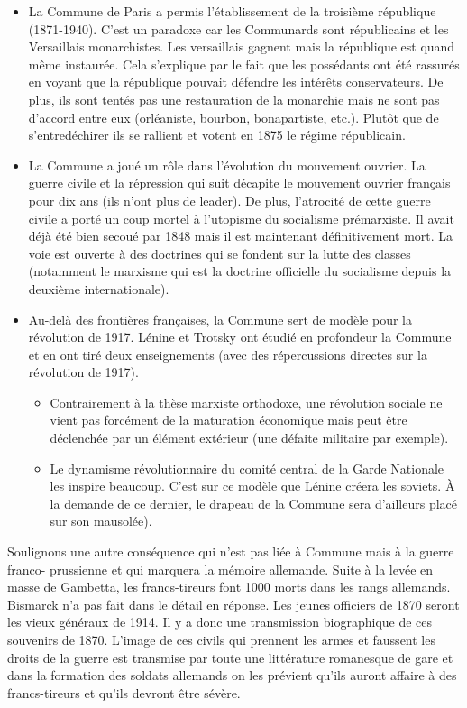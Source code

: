 \documentclass[12pt]{report}
\begin{document}
\begin{itemize}
	\item La Commune de Paris a permis l’établissement de la troisième république (1871-1940).
C’est un paradoxe car les Communards sont républicains et les Versaillais
monarchistes. Les versaillais gagnent mais la république est quand même instaurée.
Cela s'explique par le fait que les possédants ont été rassurés en voyant que la république pouvait défendre les
intérêts conservateurs. 
De plus, ils sont tentés pas une restauration de la monarchie
mais ne sont pas d’accord entre eux (orléaniste, bourbon, bonapartiste, etc.). Plutôt que
de s’entredéchirer ils se rallient et votent en 1875 le régime républicain.
\item La Commune a joué un rôle dans l'évolution du mouvement ouvrier. La guerre civile et la répression qui suit
décapite le mouvement ouvrier français pour dix ans (ils n'ont plus de leader).
De plus, l’atrocité de cette guerre civile a porté un coup mortel à l’utopisme du
socialisme prémarxiste. Il avait déjà été bien secoué par 1848 mais il est
maintenant définitivement mort. La voie est ouverte à des doctrines qui se
fondent sur la lutte des classes (notamment le marxisme qui est la doctrine
officielle du socialisme depuis la deuxième internationale).
\item Au-delà des frontières françaises, la Commune sert de modèle pour la révolution de
1917. Lénine et Trotsky ont étudié en profondeur la Commune et en ont tiré deux
enseignements (avec des répercussions directes sur la révolution de 1917).
\begin{itemize}
\item Contrairement à la thèse marxiste orthodoxe, une révolution sociale ne vient
pas forcément de la maturation économique mais peut être déclenchée par un
élément extérieur (une défaite militaire par exemple).
\item Le dynamisme révolutionnaire du comité central de la Garde Nationale les
inspire beaucoup. C’est sur ce modèle que Lénine créera les soviets. À la
demande de ce dernier, le drapeau de la Commune sera d’ailleurs placé sur son
mausolée).
\end{itemize}
\end{itemize}

Soulignons une autre conséquence qui n’est pas liée à Commune mais à la guerre franco-
prussienne et qui marquera la mémoire allemande. Suite à la levée en masse de Gambetta,
les francs-tireurs font 1000 morts dans les rangs allemands. Bismarck n’a pas fait dans le
détail en réponse. Les jeunes officiers de 1870 seront les vieux généraux de 1914. Il y a donc
une transmission biographique de ces souvenirs de 1870. L’image de ces civils qui prennent
les armes et faussent les droits de la guerre est transmise par toute une littérature romanesque
de gare et dans la formation des soldats allemands on les prévient qu’ils auront affaire à des
francs-tireurs et qu’ils devront être sévère.
\end{document}
